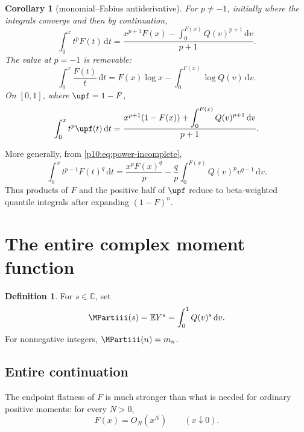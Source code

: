 \documentclass[11pt,oneside]{article}
\newtheorem{corollary}[theorem]{Corollary}
\theoremstyle{definition}
\newtheorem{definition}[theorem]{Definition}
\theoremstyle{remark}
\newcommand{\F}{F}
\newcommand{\Q}{Q}
\newcommand{\E}{\mathbb E}
\newcommand{\C}{\mathbb C}
\newcommand{\dd}{\,\mathrm d}
\newcommand{\1}{\mathbf 1}
\begin{document}
\begin{corollary}[monomial--Fabius antiderivative]\label{p10:cor:monomial-F}
For \(p\ne-1\), initially where the integrals converge and then by continuation,
\begin{equation}\label{p10:eq:monomial-F-antiderivative}
 \int_0^x t^p\F(t)\dd t
 =\frac{x^{p+1}\F(x)-\displaystyle\int_0^{\F(x)}\Q(v)^{p+1}\dd v}{p+1}.
\end{equation}
The value at \(p=-1\) is removable:
\begin{equation}\label{p10:eq:F-over-x-incomplete}
 \int_0^x\frac{\F(t)}t\dd t
 =\F(x)\log x-\int_0^{\F(x)}\log\Q(v)\dd v.
\end{equation}
On \([0,1]\), where \(\upf=1-\F\),
\begin{equation}\label{p10:eq:monomial-up-half-antiderivative}
 \int_0^x t^p\upf(t)\dd t
 =\frac{x^{p+1}(1-\F(x))+\displaystyle\int_0^{\F(x)}\Q(v)^{p+1}\dd v}{p+1}.
\end{equation}
\end{corollary}

More generally, from \cref{p10:eq:power-incomplete},
\begin{equation}\label{p10:eq:Fpower-antiderivative}
 \int_0^x t^{p-1}\F(t)^q\dd t
 =\frac{x^p\F(x)^q}{p}
 -\frac{q}{p}\int_0^{\F(x)}\Q(v)^p v^{q-1}\dd v.
\end{equation}
Thus products of \(\F\) and the positive half of \(\upf\) reduce to beta-weighted
quantile integrals after expanding \((1-\F)^n\).

\section{The entire complex moment function}

\begin{definition}\label{p10:def:M}
For \(s\in\C\), set
\begin{equation}\label{p10:eq:Mdef}
 \MPartiii(s)=\E Y^s=\int_0^1\Q(v)^s\dd v.
\end{equation}
For nonnegative integers, \(\MPartiii(n)=m_n\).
\end{definition}

\subsection{Entire continuation}

The endpoint flatness of \(\F\) is much stronger than what is needed for ordinary
positive moments: for every \(N>0\),
\begin{equation}\label{p10:eq:F-flat-bound}
 \F(x)=O_N(x^N)\qquad(x\downarrow0).
\end{equation}
\end{document}
